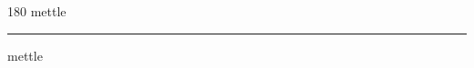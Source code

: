 
\begin{frame}
\begin{center}
\begin{turn}{180}
{\fontsize{2.5cm}{1em}\selectfont mettle}
\end{turn}
\vspace{1em}\par  
\hrule
\vspace{1em}\par  
{\fontsize{2.5cm}{1em}\selectfont mettle}
\end{center}
\end{frame}

